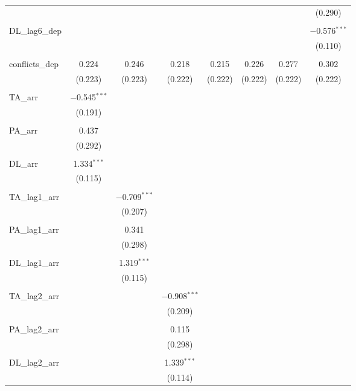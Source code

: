 \begin{table}[!htbp]
\begin{tabular}{@{\extracolsep{5pt}}lccccccc}
  &  &  &  &  &  &  & (0.290) \\ 
  & & & & & & & \\ 
 DL\_lag6\_dep &  &  &  &  &  &  & $-$0.576$^{***}$ \\ 
  &  &  &  &  &  &  & (0.110) \\ 
  & & & & & & & \\ 
 conflicts\_dep & 0.224 & 0.246 & 0.218 & 0.215 & 0.226 & 0.277 & 0.302 \\ 
  & (0.223) & (0.223) & (0.222) & (0.222) & (0.222) & (0.222) & (0.222) \\ 
  & & & & & & & \\ 
 TA\_arr & $-$0.545$^{***}$ &  &  &  &  &  &  \\ 
  & (0.191) &  &  &  &  &  &  \\ 
  & & & & & & & \\ 
 PA\_arr & 0.437 &  &  &  &  &  &  \\ 
  & (0.292) &  &  &  &  &  &  \\ 
  & & & & & & & \\ 
 DL\_arr & 1.334$^{***}$ &  &  &  &  &  &  \\ 
  & (0.115) &  &  &  &  &  &  \\ 
  & & & & & & & \\ 
 TA\_lag1\_arr &  & $-$0.709$^{***}$ &  &  &  &  &  \\ 
  &  & (0.207) &  &  &  &  &  \\ 
  & & & & & & & \\ 
 PA\_lag1\_arr &  & 0.341 &  &  &  &  &  \\ 
  &  & (0.298) &  &  &  &  &  \\ 
  & & & & & & & \\ 
 DL\_lag1\_arr &  & 1.319$^{***}$ &  &  &  &  &  \\ 
  &  & (0.115) &  &  &  &  &  \\ 
  & & & & & & & \\ 
 TA\_lag2\_arr &  &  & $-$0.908$^{***}$ &  &  &  &  \\ 
  &  &  & (0.209) &  &  &  &  \\ 
  & & & & & & & \\ 
 PA\_lag2\_arr &  &  & 0.115 &  &  &  &  \\ 
  &  &  & (0.298) &  &  &  &  \\ 
  & & & & & & & \\ 
 DL\_lag2\_arr &  &  & 1.339$^{***}$ &  &  &  &  \\ 
  &  &  & (0.114) &  &  &  &  \\ 

\end{tabular}
\end{table}
